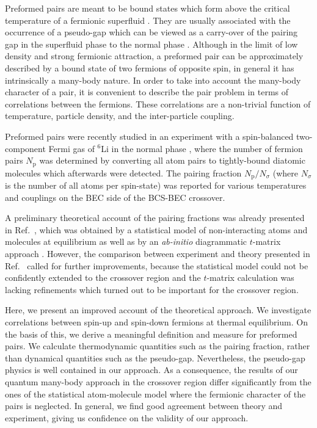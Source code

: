\documentclass[pra,twocolumn,aps,amssymb,showpacs,superscriptaddress]{revtex4-1}
\begin{document}
Preformed pairs are meant to be bound states which form above the critical temperature of a fermionic superfluid  \cite{Micnas-1990,Capone-2016}. 
They are usually associated with the occurrence of a pseudo-gap which can be viewed as a carry-over of the pairing gap in the superfluid phase to the normal phase \cite{Levin-2005}. 
Although in the limit of low density and strong fermionic attraction, a preformed pair can be approximately described by a bound state of two fermions of opposite spin, in general it has 
intrinsically a many-body nature. 
In order to take into account the many-body character of a pair, it is convenient to describe the pair problem in terms of correlations between the fermions. 
These correlations are a non-trivial function of temperature, particle density, and the inter-particle coupling.

Preformed pairs were recently studied in an experiment with a spin-balanced two-component Fermi gas of $^6$Li in the normal phase \cite{Ulm-Cam-2019},  where the number of fermion pairs $N_{\mathrm{p}}$ was determined by converting all atom pairs to tightly-bound diatomic molecules which afterwards were detected. 
The pairing fraction $N_{\mathrm{p}}/N_{\sigma}$ (where $N_{\sigma}$ is the number of all atoms per spin-state) was reported for various temperatures and couplings on the BEC side 
of the BCS-BEC crossover.

A preliminary theoretical account of the pairing fractions was already presented in Ref.~\cite{Ulm-Cam-2019}, which was obtained by a statistical model of non-interacting atoms and molecules 
at equilibrium \cite{Chin-Grimm-2004,Eagles-1969} as well as by an \emph{ab-initio} diagrammatic $t$-matrix approach \cite{PPS-2019}. 
However, the comparison between experiment and theory presented in Ref.~\cite{Ulm-Cam-2019} called for further improvements, because the statistical model could not be confidently 
extended to the crossover region and the $t$-matrix calculation was lacking refinements which turned out to be important for the crossover region.

Here, we present an improved account of the theoretical approach. 
We investigate correlations between spin-up and spin-down fermions at thermal equilibrium. 
On the basis of this, we derive a meaningful definition and measure for preformed pairs. 
We calculate thermodynamic quantities such as the pairing fraction, rather than dynamical quantities such as the pseudo-gap. 
Nevertheless, the pseudo-gap physics is well contained in our approach. 
As a consequence, the results of our quantum many-body approach in the crossover region differ significantly from the ones of the statistical atom-molecule model where the fermionic character of the pairs is neglected. 
In general, we find good agreement between theory and experiment, giving us confidence on the validity of our approach.
\end{document}
